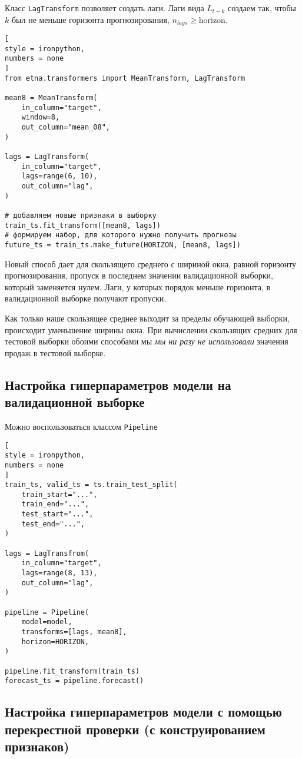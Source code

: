 \documentclass[%
	11pt,
	a4paper,
	utf8,
		]{article}
\begin{document}
Класс \verb|LagTransform| позволяет создать лаги. Лаги вида $L_{t -k}$ создаем так, чтобы $k$ был не меньше горизонта прогнозирования, $n_{lags} \geqslant \text{horizon}$.

\begin{lstlisting}[
style = ironpython,
numbers = none
]
from etna.transformers import MeanTransform, LagTransform

mean8 = MeanTransform(
    in_column="target",
    window=8,
    out_column="mean_08",
)

lags = LagTransform(
    in_column="target",
    lags=range(6, 10),
    out_column="lag",
)

# добавляем новые признаки в выборку
train_ts.fit_transform([mean8, lags])
# формируем набор, для которого нужно получить прогнозы
future_ts = train_ts.make_future(HORIZON, [mean8, lags])
\end{lstlisting}

Новый способ дает для скользящего среднего с шириной окна, равной горизонту прогнозирования, пропуск в последнем значении валидационной выборки, который заменяется нулем. Лаги, у которых порядок меньше горизонта, в валидационной выборке получают пропуски.

Как только наше скользящее среднее выходит за пределы обучающей выборки, происходит уменьшение ширины окна. При вычислении скользящих средних для тестовой выборки обоими способами мы \emph{мы ни разу не использовали} значения продаж в тестовой выборке.

\subsection{Настройка гиперпараметров модели на валидационной выборке}

Можно воспользоваться классом \verb|Pipeline|
\begin{lstlisting}[
style = ironpython,
numbers = none
]
train_ts, valid_ts = ts.train_test_split(
    train_start="...",
    train_end="...",
    test_start="...",
    test_end="...",
)

lags = LagTransfrom(
    in_column="target",
    lags=range(8, 13),
    out_column="lag",
)

pipeline = Pipeline(
    model=model,
    transforms=[lags, mean8],
    horizon=HORIZON,
)

pipeline.fit_transform(train_ts)
forecast_ts = pipeline.forecast()
\end{lstlisting}

\subsection{Настройка гиперпараметров модели с помощью перекрестной проверки (с конструированием признаков)}
\end{document}
